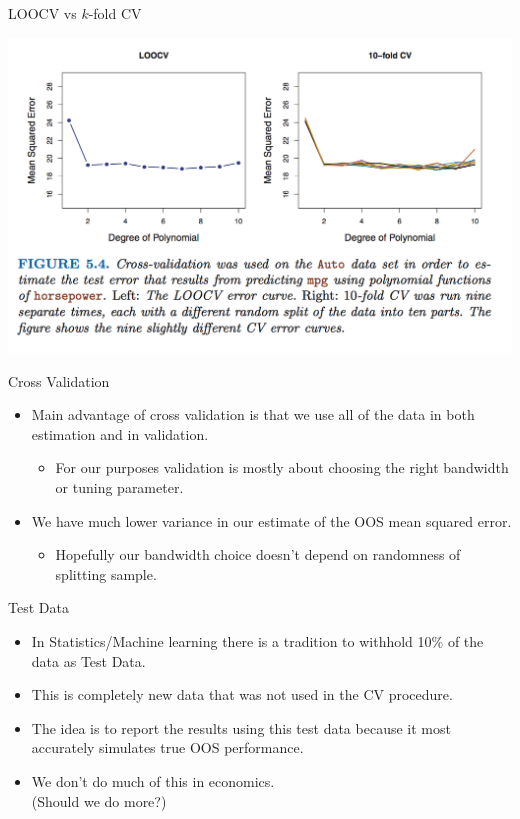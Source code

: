 \documentclass[11pt, aspectratio=169]{beamer}
\begin{document}
\begin{frame}{LOOCV vs $k$-fold CV}
  \begin{center}
  \includegraphics[width=\textwidth]{./resources/comparison-cv}
  \end{center}
\end{frame}
  


\begin{frame}{Cross Validation}
  \begin{itemize}
  \item Main advantage of cross validation is that we use all of the data in both \alert{estimation} and in \alert{validation}.
  \begin{itemize}
  \item For our purposes validation is mostly about choosing the right bandwidth or tuning parameter.
  \end{itemize}
  \item We have much lower variance in our estimate of the OOS mean squared error.
  \begin{itemize}
  \item Hopefully our bandwidth choice doesn't depend on randomness of splitting sample.
  \end{itemize}
  \end{itemize}
\end{frame}
  
  
\begin{frame}{Test Data}
  \begin{itemize}
  \item In Statistics/Machine learning there is a tradition to withhold 10\% of the data as \alert{Test Data}.
  \item This is \alert{completely new data} that was not used in the CV procedure.
  \item The idea is to report the results using this test data because it most accurately simulates true OOS performance.
  \item We don't do much of this in economics.\\
   (Should we do more?)
  \end{itemize}
\end{frame}
\end{document}
